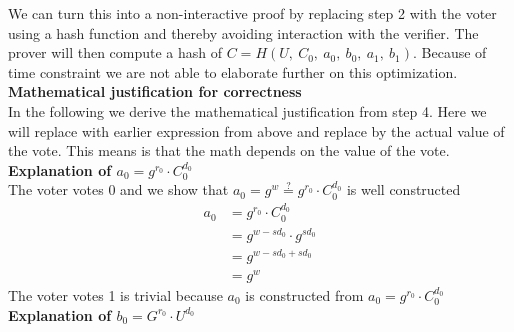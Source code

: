 \noindent
We can turn this into a non-interactive proof by replacing step 2 with the voter using a hash function and thereby avoiding interaction with the verifier. The prover will then compute a hash of \begin{math}C=H(U,\ C_0,\ a_0,\ b_0,\ a_1,\ b_1) \end{math}. Because of time constraint we are not able to elaborate further on this optimization. \\




\noindent
\textbf{Mathematical justification for correctness}\\
In the following we derive the mathematical justification from step 4. Here we will replace with earlier expression from above and replace by the actual value of the vote. This means is that the math depends on the value of the vote.\\

\noindent
\textbf{Explanation of \begin{math}a_0=g^{r_0}  \cdot  C^{d_0}_0\end{math}}\\

\noindent
The voter votes 0 and we show that \begin{math}a_0= g^w \stackrel{?}{=} g^{r_0}  \cdot  C^{d_0}_0 \end{math} is well constructed
\begin{align*}
    a_0 &=g^{r_0}  \cdot  C^{d_0}_0     \\ 
        &= g^{w-sd_0} \cdot  g^{sd_0}   \\
        &= g^{w-sd_0+ sd_0}             \\
        &= g^w                          
\end{align*}
The voter votes 1 is trivial because \begin{math}a_0 \end{math}  is constructed from \begin{math}a_0=g^{r_0}  \cdot  C^{d_0}_0 \end{math}\\



\noindent
\textbf{Explanation of \begin{math}b_0 = G^{r_0} \cdot U^{d_0}\end{math}}\\

